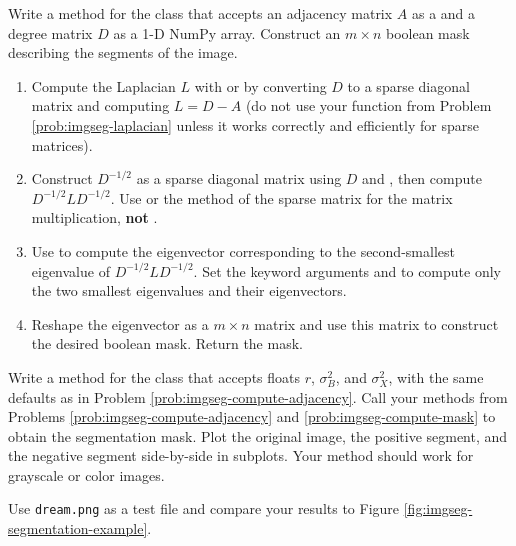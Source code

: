 Write a method for the  class that accepts an adjacency matrix $A$ as a  and a degree matrix $D$ as a 1-D NumPy array.
Construct an $m\times n$ boolean mask describing the segments of the image.
\begin{enumerate}
    \item Compute the Laplacian $L$ with  or by converting $D$ to a sparse diagonal matrix and computing $L = D - A$ (do not use your function from Problem \ref{prob:imgseg-laplacian} unless it works correctly and efficiently for sparse matrices).

    \item Construct $D^{-1/2}$ as a sparse diagonal matrix using $D$ and , then compute $D^{-1/2}LD^{-1/2}$.
    Use  or the  method of the sparse matrix for the matrix multiplication, \textbf{not} .

    \item Use  to compute the eigenvector corresponding to the second-smallest eigenvalue of $D^{-1/2} L D^{-1/2}$.
    Set the keyword arguments  and  to compute only the two smallest eigenvalues and their eigenvectors.

    \item Reshape the eigenvector as a $m\times n$ matrix and use this matrix to construct the desired boolean mask.
    Return the mask.
\end{enumerate}
\label{prob:imgseg-compute-mask}

Write a method for the  class that accepts floats $r$, $\sigma_B^2$, and $\sigma_X^2$, with the same defaults as in Problem \ref{prob:imgseg-compute-adjacency}.
Call your methods from Problems \ref{prob:imgseg-compute-adjacency} and \ref{prob:imgseg-compute-mask} to obtain the segmentation mask.
Plot the original image, the positive segment, and the negative segment side-by-side in subplots.
Your method should work for grayscale or color images.

Use \texttt{dream.png} as a test file and compare your results to Figure \ref{fig:imgseg-segmentation-example}.

